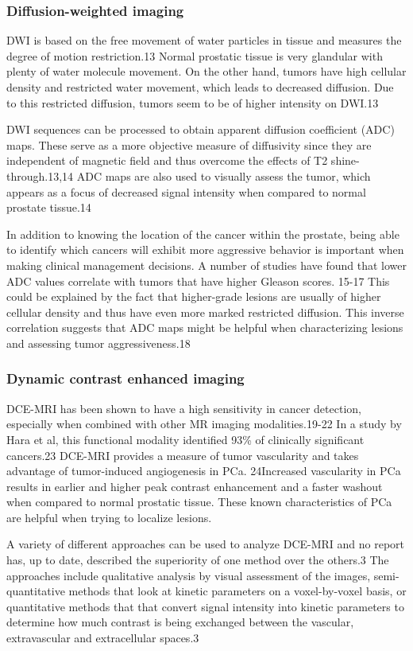 \subsubsection{Diffusion-weighted imaging}
DWI is based on the free movement of water particles in tissue and measures the
degree of motion restriction.13 Normal prostatic tissue is very glandular with
plenty of water molecule movement. On the other hand, tumors have high cellular
density and restricted water movement, which leads to decreased diffusion. Due
to this restricted diffusion, tumors seem to be of higher intensity on DWI.13

DWI sequences can be processed to obtain apparent diffusion coefficient (ADC)
maps. These serve as a more objective measure of diffusivity since they are
independent of magnetic field and thus overcome the effects of T2
shine-through.13,14  ADC maps are also used to visually assess the tumor, which
appears as a focus of decreased signal intensity when compared to normal
prostate tissue.14 

In addition to knowing the location of the cancer within the prostate, being
able to identify which cancers will exhibit more aggressive behavior is
important when making clinical management decisions. A number of studies have
found that lower ADC values correlate with tumors that have higher Gleason
scores. 15-17 This could be explained by the fact that higher-grade lesions are
usually of higher cellular density and thus have even more marked restricted
diffusion. This inverse correlation suggests that ADC maps might be helpful
when characterizing lesions and assessing tumor aggressiveness.18 

\subsubsection{Dynamic contrast enhanced imaging}
DCE-MRI has been shown to have a high sensitivity in cancer detection,
especially when combined with other MR imaging modalities.19-22 In a study by
Hara et al, this functional modality identified 93\% of clinically significant
cancers.23 DCE-MRI provides a measure of tumor vascularity and takes advantage
of tumor-induced angiogenesis in PCa. 24Increased vascularity in PCa results in
earlier and higher peak contrast enhancement and a faster washout when compared
to normal prostatic tissue. These known characteristics of PCa are helpful when
trying to localize lesions. 

A variety of different approaches can be used to analyze DCE-MRI and no report
has, up to date, described the superiority of one method over the others.3 The
approaches include qualitative analysis by visual assessment of the images,
semi-quantitative methods that look at kinetic parameters on a voxel-by-voxel
basis, or quantitative methods that that convert signal intensity into kinetic
parameters to determine how much contrast is being exchanged between the
vascular, extravascular and extracellular spaces.3
    

